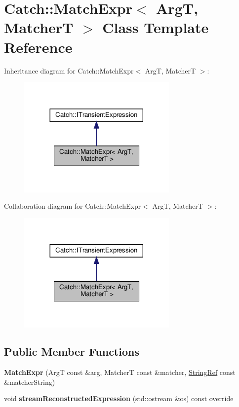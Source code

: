 \hypertarget{classCatch_1_1MatchExpr}{}\section{Catch\+::Match\+Expr$<$ ArgT, MatcherT $>$ Class Template Reference}
\label{classCatch_1_1MatchExpr}


Inheritance diagram for Catch\+::Match\+Expr$<$ ArgT, MatcherT $>$\+:\nopagebreak
\begin{figure}[H]
\begin{center}
\leavevmode
\includegraphics[width=221pt]{classCatch_1_1MatchExpr__inherit__graph}
\end{center}
\end{figure}


Collaboration diagram for Catch\+::Match\+Expr$<$ ArgT, MatcherT $>$\+:\nopagebreak
\begin{figure}[H]
\begin{center}
\leavevmode
\includegraphics[width=221pt]{classCatch_1_1MatchExpr__coll__graph}
\end{center}
\end{figure}
\subsection*{Public Member Functions}
\begin{DoxyCompactItemize}
\item 
\mbox{\label{classCatch_1_1MatchExpr_ae55ee9bf46c8676c65e9df291a98c345}} 
{\bfseries Match\+Expr} (ArgT const \&arg, MatcherT const \&matcher, \mbox{\hyperlink{classCatch_1_1StringRef}{String\+Ref}} const \&matcher\+String)
\item 
\mbox{\label{classCatch_1_1MatchExpr_ad3e41adb597750b2219bb37e51185629}} 
void {\bfseries stream\+Reconstructed\+Expression} (std\+::ostream \&os) const override
\end{DoxyCompactItemize}
